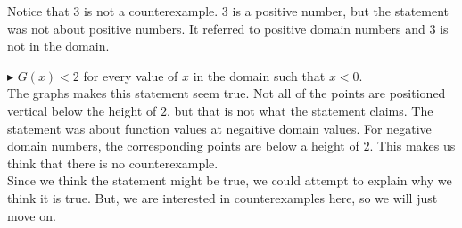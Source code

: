 \documentclass{ximera}
\begin{document}
Notice that $3$ is not a counterexample.  $3$ is a positive number, but the statement was not about positive numbers.  It referred to positive domain numbers and $3$ is not in the domain.














\textbf{\textcolor{red!90!darkgray}{$\blacktriangleright$}} $G(x) < 2$  for every value of $x$ in the domain such that $x < 0$. \\

The graphs makes this statement seem true.  Not all of the points are positioned vertical below the height of $2$, but that is not what the statement claims. The statement was about function values at negaitive domain values. For negative domain numbers, the corresponding points are below a height of $2$.  This makes us think that there is no counterexample.  \\

Since we think the statement might be true, we could attempt to explain why we think it is true.  But, we are interested in counterexamples here, so we will just move on.
\end{document}
